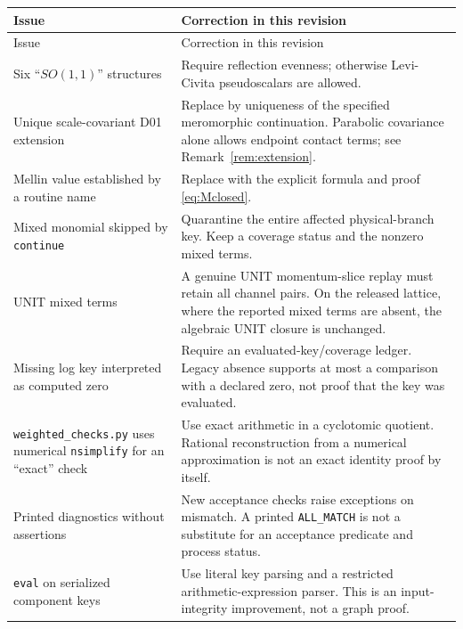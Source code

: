 \documentclass[11pt,a4paper]{article}
\newcommand{\loc}[1]{\nolinkurl{#1}}
\theoremstyle{plain}
\theoremstyle{definition}
\theoremstyle{remark}
\numberwithin{equation}{section}
\begin{document}
\begingroup\small
\begin{longtable}{@{}L{.31\linewidth}L{.62\linewidth}@{}}
\toprule
Issue & Correction in this revision\\
\midrule
\endfirsthead
\toprule
Issue & Correction in this revision\\
\midrule
\endhead
\bottomrule
\endfoot

Six ``\(SO(1,1)\)'' structures &
Require reflection evenness; otherwise Levi-Civita
pseudoscalars are allowed.\\

Unique scale-covariant D01 extension &
Replace by uniqueness of the specified meromorphic
continuation. Parabolic covariance alone allows endpoint
contact terms; see Remark~\ref{rem:extension}.\\

Mellin value established by a routine name &
Replace with the explicit formula and proof
\eqref{eq:Mclosed}.\\

Mixed monomial skipped by \loc{continue} &
Quarantine the entire affected physical-branch key.
Keep a coverage status and the nonzero mixed terms.\\

UNIT mixed terms &
A genuine UNIT momentum-slice replay must retain all channel
pairs. On the released lattice, where the reported mixed terms
are absent, the algebraic UNIT closure is unchanged.\\

Missing log key interpreted as computed zero &
Require an evaluated-key/coverage ledger.
Legacy absence supports at most a comparison with a declared
zero, not proof that the key was evaluated.\\

\loc{weighted_checks.py} uses numerical
\loc{nsimplify} for an ``exact'' check &
Use exact arithmetic in a cyclotomic quotient. Rational
reconstruction from a numerical approximation is not an exact
identity proof by itself.\\

Printed diagnostics without assertions &
New acceptance checks raise exceptions on mismatch.
A printed \loc{ALL_MATCH} is not a substitute for an acceptance
predicate and process status.\\

\loc{eval} on serialized component keys &
Use literal key parsing and a restricted arithmetic-expression
parser. This is an input-integrity improvement, not a graph proof.\\


\end{longtable}
\end{document}
